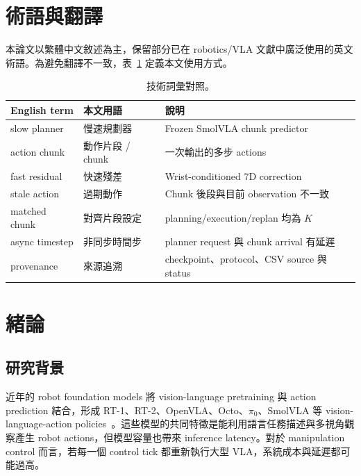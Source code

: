 \documentclass[12pt,a4paper,oneside]{report}
\newcommand{\smolvla}{SmolVLA}
\begin{document}
\chapter*{術語與翻譯}

本論文以繁體中文敘述為主，保留部分已在 robotics/VLA 文獻中廣泛使用的英文術語。為避免翻譯不一致，表~\ref{tab:glossary} 定義本文使用方式。

\begin{table}[htbp]
  \centering
  \caption{技術詞彙對照。}
  \label{tab:glossary}
  \begin{tabular}{@{}lll@{}}
    \toprule
    English term & 本文用語 & 說明 \\
    \midrule
    slow planner & 慢速規劃器 & Frozen \smolvla{} chunk predictor \\
    action chunk & 動作片段 / chunk & 一次輸出的多步 actions \\
    fast residual & 快速殘差 & Wrist-conditioned 7D correction \\
    stale action & 過期動作 & Chunk 後段與目前 observation 不一致 \\
    matched chunk & 對齊片段設定 & planning/execution/replan 均為 $K$ \\
    async timestep & 非同步時間步 & planner request 與 chunk arrival 有延遲 \\
    provenance & 來源追溯 & checkpoint、protocol、CSV source 與 status \\
    \bottomrule
  \end{tabular}
\end{table}

\chapter{緒論}

\section{研究背景}

近年的 robot foundation models 將 vision-language pretraining 與 action prediction 結合，形成 RT-1、RT-2、OpenVLA、Octo、$\pi_0$、\smolvla{} 等 vision-language-action policies~\citep{brohan2022rt1,brohan2023rt2,kim2024openvla,ghosh2024octo,black2024pi0,shukor2025smolvla}。這些模型的共同特徵是能利用語言任務描述與多視角觀察產生 robot actions，但模型容量也帶來 inference latency。對於 manipulation control 而言，若每一個 control tick 都重新執行大型 VLA，系統成本與延遲都可能過高。
\end{document}
